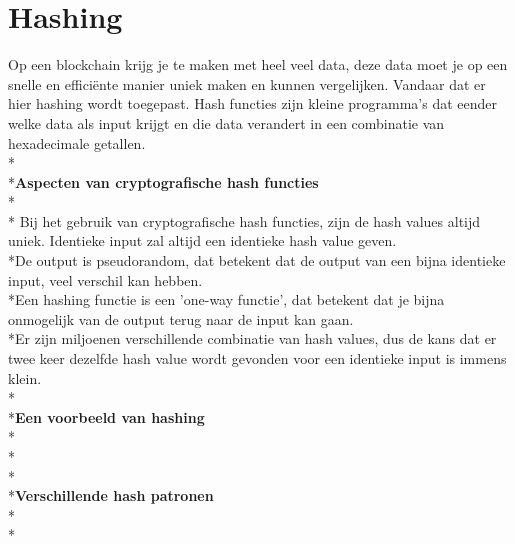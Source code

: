 \documentclass[fleqn,a4paper,12pt]{book}
\begin{document}
\section{Hashing}
Op een blockchain krijg je te maken met heel veel data, deze data moet je op een snelle en efficiënte manier uniek maken en kunnen vergelijken. Vandaar dat er hier hashing wordt toegepast. Hash functies zijn kleine programma's dat eender welke data als input krijgt en die data verandert in een combinatie van hexadecimale getallen.
\\*\\*\textbf{Aspecten van cryptografische hash functies}\\*\\*
Bij het gebruik van cryptografische hash functies, zijn de hash values altijd uniek. Identieke input zal altijd een identieke hash value geven.\\*De output is pseudorandom, dat betekent dat de output van een bijna identieke input, veel verschil kan hebben.\\*Een hashing functie is een 'one-way functie', dat betekent dat je bijna onmogelijk van de output terug naar de input kan gaan.\\*Er zijn miljoenen verschillende combinatie van hash values, dus de kans dat er twee keer dezelfde hash value wordt gevonden voor een identieke input is immens klein.
\\*\\*\textbf{Een voorbeeld van hashing}\\*\\*
\\*\\*\textbf{Verschillende hash patronen}\\*\\*
\end{document}
